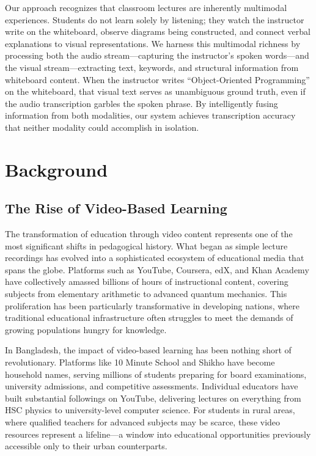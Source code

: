Our approach recognizes that classroom lectures are inherently multimodal experiences. Students do not learn solely by listening; they watch the instructor write on the whiteboard, observe diagrams being constructed, and connect verbal explanations to visual representations. We harness this multimodal richness by processing both the audio stream---capturing the instructor's spoken words---and the visual stream---extracting text, keywords, and structural information from whiteboard content. When the instructor writes ``Object-Oriented Programming'' on the whiteboard, that visual text serves as unambiguous ground truth, even if the audio transcription garbles the spoken phrase. By intelligently fusing information from both modalities, our system achieves transcription accuracy that neither modality could accomplish in isolation.

\section{Background}

\subsection{The Rise of Video-Based Learning}

The transformation of education through video content represents one of the most significant shifts in pedagogical history. What began as simple lecture recordings has evolved into a sophisticated ecosystem of educational media that spans the globe. Platforms such as YouTube, Coursera, edX, and Khan Academy have collectively amassed billions of hours of instructional content, covering subjects from elementary arithmetic to advanced quantum mechanics. This proliferation has been particularly transformative in developing nations, where traditional educational infrastructure often struggles to meet the demands of growing populations hungry for knowledge.

In Bangladesh, the impact of video-based learning has been nothing short of revolutionary. Platforms like 10 Minute School and Shikho have become household names, serving millions of students preparing for board examinations, university admissions, and competitive assessments. Individual educators have built substantial followings on YouTube, delivering lectures on everything from HSC physics to university-level computer science. For students in rural areas, where qualified teachers for advanced subjects may be scarce, these video resources represent a lifeline---a window into educational opportunities previously accessible only to their urban counterparts.

